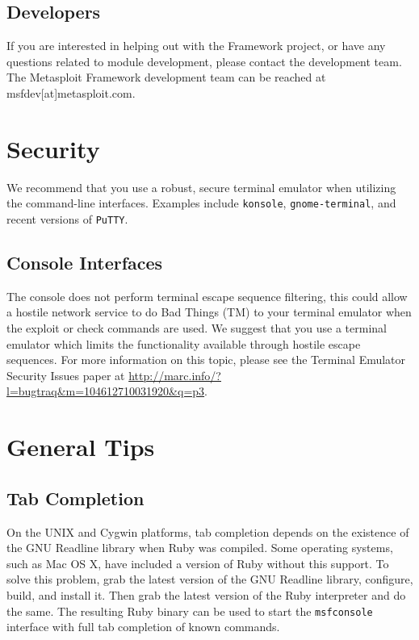 \documentclass{report}
\begin{document}
\section{Developers}

\par
If you are interested in helping out with the Framework project, or have any
questions related to module development, please contact the development team.
The Metasploit Framework development team can be reached at
msfdev[at]metasploit.com.

\pagebreak

\appendix

\pagebreak

\chapter{Security}

\par
We recommend that you use a robust, secure terminal emulator when utilizing the
command-line interfaces. Examples include \texttt{konsole},
\texttt{gnome-terminal}, and recent versions of \texttt{PuTTY}.

	\section{Console Interfaces}

\par
The console does not perform terminal escape sequence filtering, this could
allow a hostile network service to do Bad Things (TM) to your terminal emulator
when the exploit or check commands are used. We suggest that you use a terminal
emulator which limits the functionality available through hostile escape
sequences. For more information on this topic, please see the Terminal Emulator
Security Issues paper at
\url{http://marc.info/?l=bugtraq&m=104612710031920&q=p3}.

\pagebreak

\chapter{General Tips}

	\section{Tab Completion}
	\label{REF-TAB}

\par
On the UNIX and Cygwin platforms, tab completion depends on the existence of the
GNU Readline library when Ruby was compiled. Some operating systems, such as Mac
OS X, have included a version of Ruby without this support. To solve this
problem, grab the latest version of the GNU Readline library, configure, build,
and install it. Then grab the latest version of the Ruby interpreter and do the
same. The resulting Ruby binary can be used to start the \texttt{msfconsole}
interface with full tab completion of known commands.
\end{document}
